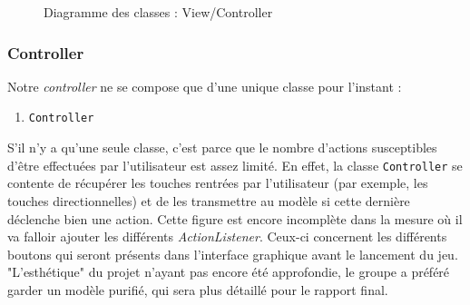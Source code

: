		
		\begin{figure}[H]
        \centering
        \quad
            \caption {Diagramme des classes : View/Controller}
        \end{figure}		
        
        \subsubsection{Controller}
        Notre \textit{controller} ne se compose que d'une unique classe pour l'instant :
        \begin{enumerate}
        \item \texttt{Controller}
        \end{enumerate}
        S'il n'y a qu'une seule classe, c'est parce que le nombre d'actions 
        susceptibles d'\^etre effectuées par l'utilisateur est assez limité. En effet,
        la classe \texttt{Controller} se contente de récupérer les touches
        rentrées par l'utilisateur (par exemple, les touches directionnelles) et de 
        les transmettre au modèle si cette dernière déclenche bien une action. Cette figure est encore incomplète dans la mesure où il va falloir ajouter les différents \textit{ActionListener}. Ceux-ci concernent les différents boutons qui seront présents dans l'interface graphique avant le lancement du jeu. "L'esthétique" du projet n'ayant pas encore été approfondie, le groupe a préféré garder un modèle purifié, qui sera plus détaillé pour le rapport final.
        
